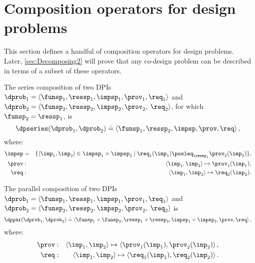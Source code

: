 \section{Composition operators for design problems}

This section defines a handful of composition operators for design
problems. Later, \cref{sec:Decomposing2} will prove that any co-design
problem can be described in terms of a subset of these operators.

\label{sec:threeoperators}
\begin{definition}[$\dpseries$]
  \label{def:series-composition}The series composition of two DPIs
  $\dprob_{1}=\langle\funsp_{1},\ressp_{1},\impsp_{1},\prov_{1},\req_{1}\rangle$
  and $\dprob_{2}=\langle\funsp_{2},\ressp_{2},\impsp_{2},\prov_{2},$
  $\req_{2}\rangle$, for which~$\funsp_{2}=\ressp_{1}$, is
  \[
    \dpseries(\dprob_{1},\dprob_{2})\doteq\left\langle \funsp_{1},\ressp_{2},\impsp,\prov,\req\right\rangle ,
  \]
  where:
  \begin{eqnarray*}
    \impsp & = & \{\left\langle \imp_{1},\imp_{2}\right\rangle \in\impsp_{1}\times\impsp_{2}\mid\req_{1}(\imp_{1})\posleq_{\ressp_{1}}\prov_{2}(\imp_{2})\},\\
    \prov & : & \left\langle \imp_{1},\imp_{2}\right\rangle \mapsto\prov_{1}(\imp_{1}),\\
    \req & : & \left\langle \imp_{1},\imp_{2}\right\rangle \mapsto\req_{2}(\imp_{2}).
  \end{eqnarray*}
\end{definition}
\begin{definition}[$\dppar$]
  \label{def:parallel}
  The parallel composition of two DPIs $\dprob_{1}=\left\langle \funsp_{1},\ressp_{1},\impsp_{1},\prov_{1},\req_{1}\right\rangle $
  and $\dprob_{2}=\langle\funsp_{2},\ressp_{2},\impsp_{2},\prov_{2},$
  $\req_{2}\rangle$ is
  \[
    \dppar(\dprob_{1},\dprob_{2})\doteq\left\langle \funsp_{1}\times\funsp_{2},\ressp_{1}\times\ressp_{2},\impsp_{1}\times\impsp_{2},\prov,\req\right\rangle ,
  \]
  where:
  \begin{eqnarray}
    \prov & : & \left\langle \imp_{1},\imp_{2}\right\rangle \mapsto\left\langle \prov_{1}(\imp_{1}),\prov_{2}(\imp_{2})\right\rangle ,\label{eq:dppar-exec}\\
    \req & : & \left\langle \imp_{1},\imp_{2}\right\rangle \mapsto\left\langle \req_{1}(\imp_{1}),\req_{2}(\imp_{2})\right\rangle .\nonumber
  \end{eqnarray}

\end{definition}


